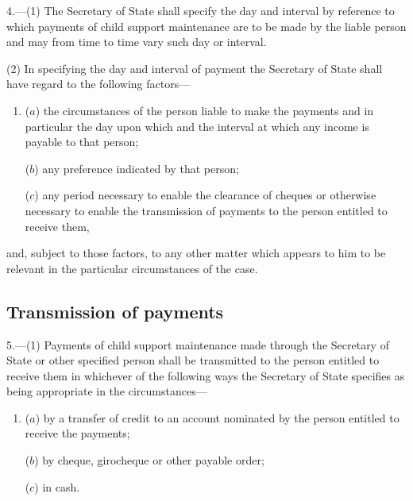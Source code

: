 \documentclass[12pt,a4paper]{article}
\begin{document}
4.—(1) The Secretary of State shall specify the day and interval by reference to which payments of child support maintenance are to be made by the liable person and may from time to time vary such day or interval.

%
%

(2) In specifying the day and interval of payment the Secretary of State shall have regard to the following factors—
\begin{enumerate}\item[]
($a$) the circumstances of the person liable to make the payments and in particular the day upon which and the interval at which any income is payable to that person;

($b$) any preference indicated by that person;

($c$) any period necessary to enable the clearance of cheques or otherwise necessary to enable the transmission of payments to the person entitled to receive them,
\end{enumerate}
and, subject to those factors, to any other matter which appears to him to be relevant in the particular circumstances of the case.


\subsection[5. Transmission of payments]{Transmission of payments}

5.—(1) Payments of child support maintenance made through the Secretary of State or other specified person shall be transmitted to the person entitled to receive them in whichever of the following ways the Secretary of State specifies as being appropriate in the circumstances—
\begin{enumerate}\item[]
($a$) by a transfer of credit to an account nominated by the person entitled to receive the payments;

($b$) by cheque, girocheque or other payable order;

($c$) in cash.
\end{enumerate}
\end{document}
